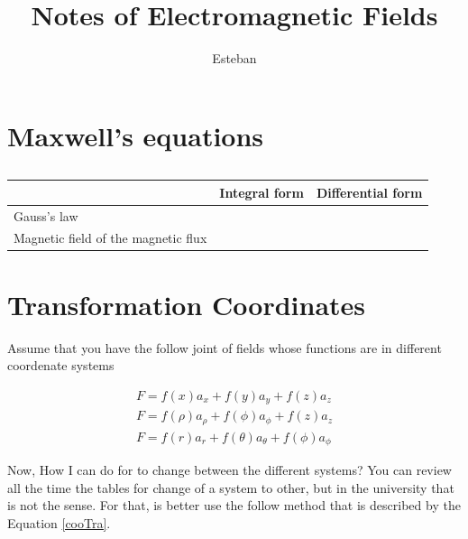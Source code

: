\documentclass[12pt,letterpaper]{book}
\title{Notes of Electromagnetic Fields}
\author{Esteban}
\begin{document}
\maketitle
\tableofcontents


\chapter{Maxwell's equations}



\begin{table}[H]
        \caption{}
        \label{DSA}
        \begin{center}
        \begin{tabular}{|p{5cm}||p{5cm}||p{5cm}|}
        \hline        
         & Integral form&Differential form \\ \hline
         \tiny{Gauss's law} &   &    \\ \hline
         \tiny{Magnetic field of the magnetic flux}&  &  \\ \hline
        \end{tabular}
        \end{center}
    \end{table}
    \vspace{0.2 cm}



\chapter{Transformation Coordinates}

Assume that you have the follow joint of fields whose  functions are in different coordenate systems

\begin{equation*}
\begin{aligned}
F=f(x)a_x+f(y)a_y+f(z)a_z\\
F=f({\rho })a_{\rho }+f({\phi })a_{\phi }+f(z)a_z\\
F=f({r })a_{r}+f({\theta })a_{\theta }+f({\phi })a_{\phi }
\end{aligned}
\end{equation*}

Now, How I can do for to change between the different systems? You can review all the time the tables for change of a system to other, but in the university that is not the sense. For that, is better use the follow method that is described by the Equation \eqref{cooTra}.\\
\end{document}
